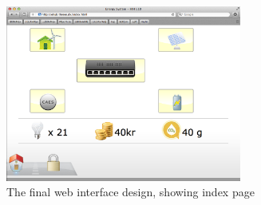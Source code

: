 \begin{figure}[H]
	\begin{centering}
		 \includegraphics[width=0.69\textwidth]{images/screen_index_page.png}
		\caption{The final web interface design, showing index page}
 	\end{centering}
\end{figure}

